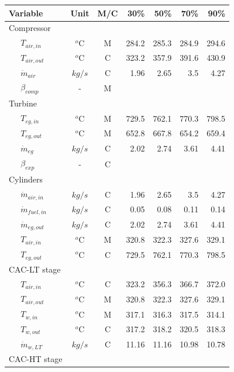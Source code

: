 \documentclass[preprint,12pt]{elsarticle}
\begin{document}
\begin{table}
	\small
	\centering
	\begin{tabular}{llccrrrr}
		\toprule
		\multicolumn{2}{l}{Variable} & Unit & M/C & 30\% & 50\% & 70\% & 90\% \\
		\midrule
		\multicolumn{2}{l}{Compressor} & & & & & & \\ 
		& 	$T_{air,in}$  		& $^o$C & M & 284.2 & 285.3 & 284.9 & 294.6 \\ 
		&	$T_{air,out}$  		& $^o$C & C  & 323.2 & 357.9 & 391.6 & 430.9 \\
		&	$\dot{m}_{air}$  	& $kg/s$ & C  & 1.96 & 2.65 & 3.5 & 4.27 \\
		&   $\beta_{comp}$		& - 	& M & & & &  \\
		\multicolumn{2}{l}{Turbine} & & & & & &  \\
		&	$T_{eg,in}$   		& $^o$C & M  & 729.5 & 762.1 & 770.3 & 798.5 \\
		&	$T_{eg,out}$  		& $^o$C & M  & 652.8 & 667.8 & 654.2 & 659.4 \\
		&	$\dot{m}_{eg}$  	& $kg/s$ & C  & 2.02 & 2.74 & 3.61 & 4.41 \\
		&   $\beta_{exp}$		& - 	& C & & & &  \\
		\multicolumn{2}{l}{Cylinders} & & & & & &   \\
		&	$\dot{m}_{air,in}$  & $kg/s$ & C  & 1.96 & 2.65 & 3.5 & 4.27 \\ 
		&	$\dot{m}_{fuel,in}$ & $kg/s$ & C  & 0.05 & 0.08 & 0.11 & 0.14 \\
		&	$\dot{m}_{eg,out}$  & $kg/s$ & C  & 2.02 & 2.74 & 3.61 & 4.41 \\
		&	$T_{air,in}$  		& $^o$C & M  & 320.8 & 322.3 & 327.6 & 329.1 \\
		&	$T_{eg,out}$  		& $^o$C & C  & 729.5 & 762.1 & 770.3 & 798.5 \\
		\multicolumn{2}{l}{CAC-LT stage} & & & & & &  \\
		&	$T_{air,in}$  		& $^o$C & C  & 323.2 & 356.3 & 366.7 & 372.0 \\ 
		&	$T_{air,out}$ 		& $^o$C & M  & 320.8 & 322.3 & 327.6 & 329.1 \\ 
		&	$T_{w,in}$   		& $^o$C & M  & 317.1 & 316.3 & 317.5 & 314.1 \\
		&	$T_{w,out}$   		& $^o$C & C  & 317.2 & 318.2 & 320.5 & 318.3 \\
		& 	$\dot{m}_{w,LT}$  	& $kg/s$ & C & 11.16 & 11.16 & 10.98 & 10.78 \\ 
		\multicolumn{2}{l}{CAC-HT stage} & & & & & & \\

\end{tabular}
\end{table}
\end{document}

